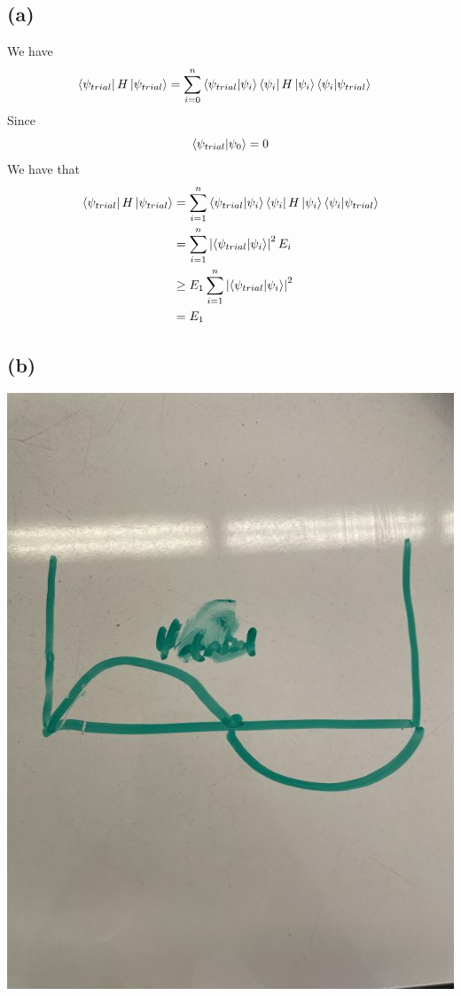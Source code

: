 \documentclass[11pt]{article}
\begin{document}
\subsection*{(a)}
We have 
\begin{align*}
    \bra{\psi_{trial}}H\ket{\psi_{trial}} &= \sum_{i=0}^{n} \bra{\psi_{trial}}\ket{\psi_i}\bra{\psi_i}H\ket{\psi_i}\bra{\psi_i}\ket{\psi_{trial}}
\end{align*}
Since 
$$\bra{\psi_{trial}}\ket{\psi_0} = 0$$
We have that 
\begin{align*}
    \bra{\psi_{trial}}H\ket{\psi_{trial}} &= \sum_{i=1}^{n} \bra{\psi_{trial}}\ket{\psi_i}\bra{\psi_i}H\ket{\psi_i}\bra{\psi_i}\ket{\psi_{trial}}\\
    &= \sum_{i=1}^{n} \left|\bra{\psi_{trial}}\ket{\psi_i}\right|^2E_i\\
    &\geq E_1\sum_{i=1}^{n} \left|\bra{\psi_{trial}}\ket{\psi_i}\right|^2\\
    &= E_1
\end{align*}
\subsection*{(b)}
\includegraphics*[scale=0.5]{prob3b.png}
\end{document}
